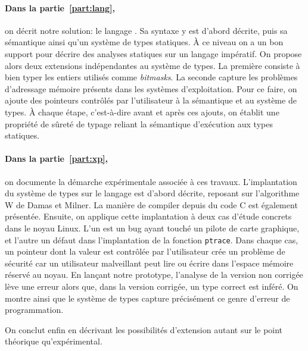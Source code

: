 \paragraph{Dans la partie~\ref{part:lang},} on décrit notre solution: le langage
\langname{}. Sa syntaxe y est d'abord décrite, puis sa sémantique ainsi qu'un
système de types statiques. À ce niveau on a un bon support pour décrire des
analyses statiques sur un langage impératif. On propose alors deux extensions
indépendantes au système de types. La première consiste à bien typer les entiers
utilisés comme \emph{bitmasks}. La seconde capture les problèmes d'adressage
mémoire présents dans les systèmes d'exploitation. Pour ce faire, on ajoute des
pointeurs contrôlés par l'utilisateur à la sémantique et au système de types. À
chaque étape, c'est-à-dire avant et après ces ajouts, on établit une propriété
de sûreté de typage reliant la sémantique d'exécution aux types statiques.

\paragraph{Dans la partie~\ref{part:xp},} on documente la démarche expérimentale
associée à ces travaux. L'implantation du système de types sur le langage
\newspeak est d'abord décrite, reposant sur l'algorithme W de Damas et Milner.
La manière de compiler depuis du code C est également présentée. Ensuite, on
applique cette implantation à deux cas d'étude concrets dans le noyau Linux.
L'un est un bug ayant touché un pilote de carte graphique, et l'autre un défaut
dans l'implantation de la fonction \texttt{ptrace}. Dans chaque cas, un pointeur
dont la valeur est contrôlée par l'utilisateur crée un problème de sécurité car
un utilisateur malveillant peut lire ou écrire dans l'espace mémoire réservé au
noyau. En lançant notre prototype, l'analyse de la version non corrigée lève une
erreur alors que, dans la version corrigée, un type correct est inféré. On
montre ainsi que le système de types capture précisément ce genre d'erreur de
programmation.

On conclut enfin en décrivant les possibilités d'extension autant sur le point
théorique qu'expérimental.

